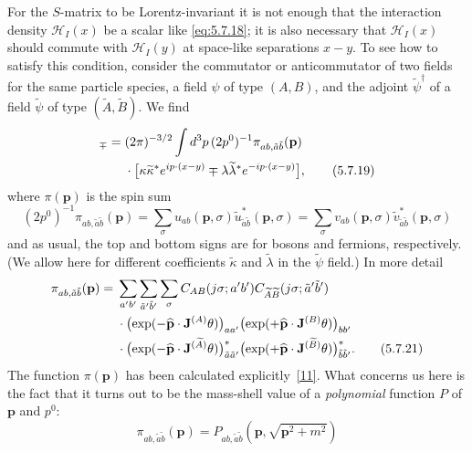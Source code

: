 For the $S$-matrix to be Lorentz-invariant it is not enough that the
interaction density $\mathcal H_I(x)$ be a scalar like \eqref{eq:5.7.18}; it is also
necessary that $\mathcal H_I(x)$ should commute with $\mathcal H_I(y)$ at
space-like separations $x-y$. To see how to satisfy this condition, consider
the commutator or anticommutator of two fields for the same particle species,
a field $\psi$ of type $(A,B)$, and the adjoint $\widetilde\psi^\dagger$ of a
field $\widetilde\psi$ of type $(\widetilde A,\widetilde B)$. We find
\begin{align}
[\psi_{ab}(x),\widetilde\psi^\dagger_{\tilde a\tilde b}(y)]_\mp
={}&(2\pi)^{-3/2}\int d^3p\,(2p^0)^{-1}
\pi_{ab,\tilde a\tilde b}(\mathbf p)
\notag\\
&\cdot\bigl[\kappa\widetilde\kappa^*e^{ip\cdot(x-y)}
\mp\lambda\widetilde\lambda^*e^{-ip\cdot(x-y)}\bigr],
\tag{5.7.19}\label{eq:5.7.19}
\end{align}
where $\pi(\mathbf p)$ is the spin sum
\begin{equation}
(2p^0)^{-1}\pi_{ab,\tilde a\tilde b}(\mathbf p)
=\sum_\sigma u_{ab}(\mathbf p,\sigma)
\widetilde u^*_{\tilde a\tilde b}(\mathbf p,\sigma)
=\sum_\sigma v_{ab}(\mathbf p,\sigma)
\widetilde v^*_{\tilde a\tilde b}(\mathbf p,\sigma)
\tag{5.7.20}\label{eq:5.7.20}
\end{equation}
and as usual, the top and bottom signs are for bosons and fermions,
respectively. (We allow here for different coefficients $\widetilde\kappa$ and
$\widetilde\lambda$ in the $\widetilde\psi$ field.) In more detail
\begin{align}
\pi_{ab,\tilde a\tilde b}(\mathbf p)={}&
\sum_{a'b'}\sum_{\tilde a'\tilde b'}\sum_\sigma
C_{AB}(j\sigma;a'b')C_{\widetilde A\widetilde B}
(j\sigma;\tilde a'\tilde b')
\notag\\
&\cdot\bigl(\exp(-\widehat{\mathbf p}\cdot\mathbf J^{(A)}\theta)\bigr)_{aa'}
\bigl(\exp(+\widehat{\mathbf p}\cdot\mathbf J^{(B)}\theta)\bigr)_{bb'}
\notag\\
&\cdot\bigl(\exp(-\widehat{\mathbf p}\cdot\mathbf J^{(\widetilde A)}\theta)\bigr)^*_{\tilde a\tilde a'}
\bigl(\exp(+\widehat{\mathbf p}\cdot\mathbf J^{(\widetilde B)}\theta)\bigr)^*_{\tilde b\tilde b'}.
\tag{5.7.21}\label{eq:5.7.21}
\end{align}
The function $\pi(\mathbf p)$ has been calculated explicitly~\hyperref[ref:5.11]{[11]}. What
concerns us here is the fact that it turns out to be the mass-shell value of a
\emph{polynomial} function $P$ of $\mathbf p$ and $p^0$:
\begin{equation}
\pi_{ab,\tilde a\tilde b}(\mathbf p)=
P_{ab,\tilde a\tilde b}(\mathbf p,\sqrt{\mathbf p^2+m^2})
\tag{5.7.22}\label{eq:5.7.22}
\end{equation}
